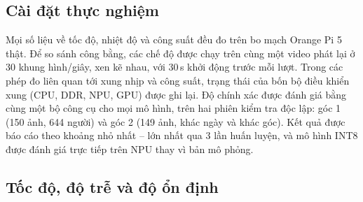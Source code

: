\documentclass[11pt,a4paper,twocolumn]{article}
\begin{document}
\subsection{Cài đặt thực nghiệm}

Mọi số liệu về tốc độ, nhiệt độ và công suất đều đo trên bo mạch Orange Pi 5 thật. Để so sánh công bằng, các chế độ được chạy trên cùng một video phát lại ở 30 khung hình/giây, xen kẽ nhau,
với 30\,s khởi động trước mỗi lượt. Trong các phép đo liên quan tới xung nhịp và công suất, trạng thái của bốn bộ điều khiển xung (CPU, DDR, NPU, GPU) được ghi lại. Độ chính xác được đánh giá bằng
cùng một bộ công cụ cho mọi mô hình, trên hai phiên kiểm tra độc lập: góc 1 (150 ảnh, 644 người) và góc 2 (149 ảnh, khác ngày và khác góc). Kết quả được báo cáo theo khoảng nhỏ nhất -- lớn nhất
qua 3 lần huấn luyện, và mô hình INT8 được đánh giá trực tiếp trên NPU thay vì bản mô phỏng.

\subsection{Tốc độ, độ trễ và độ ổn định}
\end{document}
